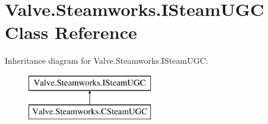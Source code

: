 \hypertarget{classValve_1_1Steamworks_1_1ISteamUGC}{}\section{Valve.\+Steamworks.\+I\+Steam\+U\+G\+C Class Reference}
\label{classValve_1_1Steamworks_1_1ISteamUGC}
Inheritance diagram for Valve.\+Steamworks.\+I\+Steam\+U\+G\+C\+:\begin{figure}[H]
\begin{center}
\leavevmode
\includegraphics[height=2.000000cm]{classValve_1_1Steamworks_1_1ISteamUGC}
\end{center}
\end{figure}
